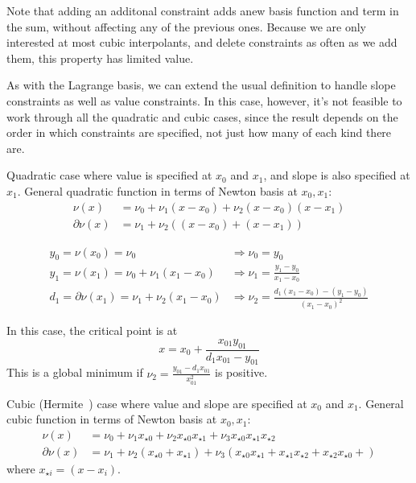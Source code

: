 Note that adding an additonal constraint
adds anew basis function and term in the sum, without affecting 
any of the previous ones.
Because we are only interested at most cubic interpolants,
and delete constraints as often as we add them,
this property has limited value.

As with the Lagrange basis, we can extend the usual definition
to handle slope constraints as well as value constraints.
In this case, however, it's not feasible to work through
all the quadratic and cubic cases, since the result depends
on the order in which constraints are specified, not just
how many of each kind there are.


Quadratic case where value is specified at $x_0$ and $x_1$,
and slope is also specified at $x_1$.
General quadratic function in terms of Newton basis at
$x_0, x_1$:
\begin{align}
\nu(x) & = \nu_0 + \nu_1 (x - x_0) + \nu_2 (x - x_0) (x - x_1) 
\\
\partial{\nu}(x) & = \nu_1 + \nu_2 \left( (x - x_0) + (x - x_1) \right)
\nonumber
\end{align}

\begin{align}
y_0 = \nu(x_0) = \nu_0 & \Rightarrow \nu_0 = y_0 
\\
y_1 = \nu(x_1) = \nu_0 + \nu_1 (x_1 - x_0) & \Rightarrow 
\nu_1 = \frac{y_1-y_0}{x_1 - x_0} 
\nonumber \\
d_1 = \partial{\nu}(x_1) = \nu_1 + \nu_2 (x_1 - x_0) & \Rightarrow 
\nu_2 = \frac{d_1 (x_1 - x_0) - (y_1-y_0)}{(x_1 - x_0)^2} 
\nonumber
\end{align}

In this case, the critical point is at
\begin{equation}
x = x_0 + \frac{x_{01} y_{01}}{d_1 x_{01} - y_{01}}
\end{equation}
This is a global minimum if 
$\nu_2 = \frac{y_{01} - d_1 x_{01}}{x_{01}^2}$
is positive.


Cubic (Hermite~\cite{wiki:cubic-hermite-spline}) 
case where value and slope are specified at $x_0$ and $x_1$.
General cubic function in terms of Newton basis at
$x_0, x_1$:
\begin{align}
\nu(x) & = \nu_0 + \nu_1 x_{{\star}0} + \nu_2 x_{{\star}0} x_{{\star}1} 
 + \nu_3 x_{{\star}0} x_{{\star}1} x_{{\star}2} \\
\partial{\nu}(x) & = \nu_1 
+ \nu_2 \left( x_{{\star}0} + x_{{\star}1} \right) 
+ \nu_3 \left( 
 x_{{\star}0} x_{{\star}1} +
 x_{{\star}1} x_{{\star}2} +
 x_{{\star}2} x_{{\star}0} +
\right)
\nonumber
\end{align}
where $x_{{\star}i} = \left(x - x_i\right)$.

